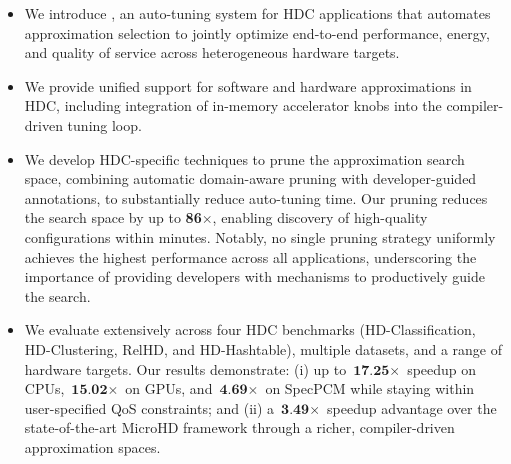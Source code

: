 \begin{itemize}
\item  We introduce \pname{}, an auto-tuning system for HDC applications that automates approximation selection to jointly optimize end-to-end performance, energy, and quality of service across heterogeneous hardware targets.
\item  We provide unified support for software and hardware approximations in HDC, including integration of in-memory accelerator knobs into the compiler-driven tuning loop.
\item We develop HDC-specific techniques to prune the approximation search space, combining automatic domain-aware pruning with developer-guided annotations, to substantially reduce auto-tuning time. Our pruning reduces the search space by up to \textbf{86}$\times$, enabling discovery of high-quality configurations within minutes. Notably, no single pruning strategy uniformly achieves the highest performance across all applications, underscoring the importance of providing developers with mechanisms to productively guide the search.
\item We evaluate \pname{} extensively across four HDC benchmarks (HD-Classification, HD-Clustering, RelHD, and HD-Hashtable), multiple datasets, and a range of hardware targets. Our results demonstrate: (i) up to $\textbf{17.25}\times$ speedup on CPUs, $\textbf{15.02}\times$ on GPUs, and $\textbf{4.69}\times$ on SpecPCM while staying within user-specified QoS constraints; and (ii) a $\textbf{3.49}\times$ speedup advantage over the state-of-the-art MicroHD framework through a richer, compiler-driven approximation spaces.




\end{itemize}

